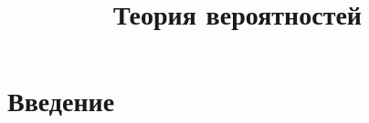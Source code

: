 \documentclass[a4paper]{report}
\title{Теория вероятностей}
\begin{document}
  \maketitle
  \tableofcontents
  \newpage

  \chapter*{Введение}

  
\end{document}

